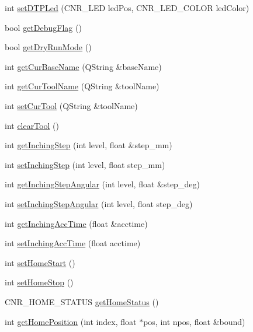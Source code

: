 \begin{DoxyCompactItemize}
\item 
int \hyperlink{classCUIApp_acb86ae6150571428671015ef6859826e}{set\-D\-T\-P\-Led} (C\-N\-R\-\_\-\-L\-E\-D led\-Pos, C\-N\-R\-\_\-\-L\-E\-D\-\_\-\-C\-O\-L\-O\-R led\-Color)
\item 
bool \hyperlink{classCUIApp_a779ad6bc661533b3c75a3f8f8cce2ece}{get\-Debug\-Flag} ()
\item 
bool \hyperlink{classCUIApp_af86f04f24e5529f99e952d69b9a9c787}{get\-Dry\-Run\-Mode} ()
\item 
int \hyperlink{classCUIApp_a1566cbcfdf9a3eb4f8c841edffa00dcc}{get\-Cur\-Base\-Name} (Q\-String \&base\-Name)
\item 
int \hyperlink{classCUIApp_a7536797eac45ecf5beb09f5fe2765b0a}{get\-Cur\-Tool\-Name} (Q\-String \&tool\-Name)
\item 
int \hyperlink{classCUIApp_a537a672e2dfec492908bf629d38cdfcb}{set\-Cur\-Tool} (Q\-String \&tool\-Name)
\item 
int \hyperlink{classCUIApp_a6ce9ba80b46f860dff309ed3326278ee}{clear\-Tool} ()
\item 
int \hyperlink{classCUIApp_a2b00b9e3246df2c98ab2303e3988049e}{get\-Inching\-Step} (int level, float \&step\-\_\-mm)
\item 
int \hyperlink{classCUIApp_a73b625566370601ba8a7c581b6426090}{set\-Inching\-Step} (int level, float step\-\_\-mm)
\item 
int \hyperlink{classCUIApp_ac424a7fd3fec4d813638342c80eefe64}{get\-Inching\-Step\-Angular} (int level, float \&step\-\_\-deg)
\item 
int \hyperlink{classCUIApp_a34d6c57d939b7b5750ace5b630f11114}{set\-Inching\-Step\-Angular} (int level, float step\-\_\-deg)
\item 
int \hyperlink{classCUIApp_a8f49d15e94fa3339041d11b121c0f81a}{get\-Inching\-Acc\-Time} (float \&acctime)
\item 
int \hyperlink{classCUIApp_a19bc933038b12820648d71d494719809}{set\-Inching\-Acc\-Time} (float acctime)
\item 
int \hyperlink{classCUIApp_aff9bfd02433068705595b74ed50b5d6e}{set\-Home\-Start} ()
\item 
int \hyperlink{classCUIApp_abcf462661e4d7a92b36a6a1bea7bc036}{set\-Home\-Stop} ()
\item 
C\-N\-R\-\_\-\-H\-O\-M\-E\-\_\-\-S\-T\-A\-T\-U\-S \hyperlink{classCUIApp_a2151edd77746c8862cc46f02319b0274}{get\-Home\-Status} ()
\item 
int \hyperlink{classCUIApp_a478a122cd1d492055b063a6836a33212}{get\-Home\-Position} (int index, float $\ast$pos, int npos, float \&bound)

\end{DoxyCompactItemize}
